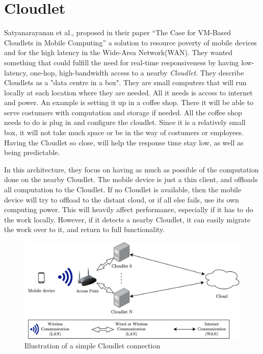 



\section{Cloudlet} \label{section:architecutres_cloudlet} 
Satyanarayanan et al., proposed in their paper “The Case for VM-Based Cloudlets in Mobile Computing”\cite{satyanarayanan_case_2009} a solution to resource poverty of mobile devices and for the high latency in the Wide-Area Network(WAN). They wanted something that could fulfill the need for real-time responsiveness by having low-latency, one-hop, high-bandwidth access to a nearby \textit{Cloudlet}. They describe Cloudlets as a "data centre in a box"\cite{satyanarayanan_case_2009}. They are small computers that will run locally at each location where they are needed. All it needs is access to internet and power. An example is setting it up in a coffee shop. There it will be able to serve costumers with computation and storage if needed. All the coffee shop needs to do is plug in and configure the cloudlet. Since it is a relatively small box, it will not take much space or be in the way of costumers or employees. Having the Cloudlet so close, will help the response time stay low, as well as being predictable.

In this architecture, they focus on having as much as possible of the computation done on the nearby Cloudlet. The mobile device is just a thin client, and offloads all computation to the Cloudlet. If no Cloudlet is available, then the mobile device will try to offload to the distant cloud, or if all else fails, use its own computing power. This will heavily affect performance, especially if it has to do the work locally. However, if it detects a nearby Cloudlet, it can easily migrate the work over to it, and return to full functionality.
 
\begin{figure}[t]
    \centering
    \includegraphics[scale=0.9]{chapters/architectures/figures/Cloudlet.png}
    \caption{Illustration of a simple Cloudlet connection}
    \label{fig:Cloudlet}
\end{figure}

